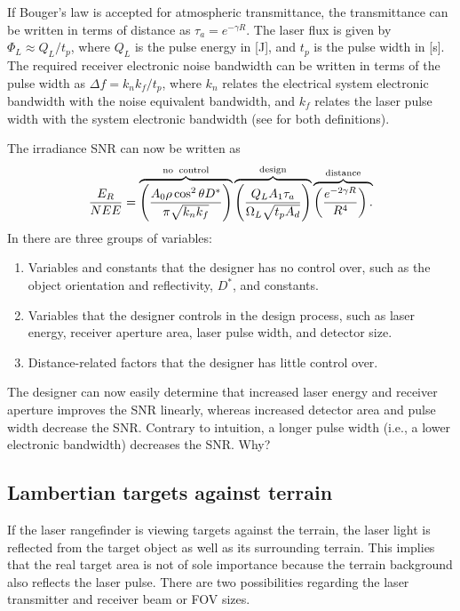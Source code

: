 If Bouger's law is accepted for atmospheric transmittance, the transmittance can be written in terms of distance as $\tau_a=e^{-\gamma R}$. The laser flux is given by $\Phi_L\approx Q_L/t_p$, where $Q_L$ is the pulse
energy in [J], and $t_p$ is the pulse width in [s]. The required receiver
electronic noise bandwidth can be written in terms of the pulse width as
$\Delta f=k_nk_f/t_p$, where 
$k_n$ relates the electrical system electronic bandwidth with the noise equivalent bandwidth, and 
$k_f$ relates the laser pulse width with the system electronic bandwidth (see \cite{Willers2013} for both definitions).

The irradiance SNR can now be written as
\begin{equation}
\frac{E_R}{NEE}=
\overbrace{
\left(\frac{A_0\rho \cos^2\theta D^\ast }{\pi \sqrt{k_nk_f}}\right)
}^{\rm no\;\;control}
\overbrace{
\left(\frac{Q_L A_1 \tau_a }{\Omega_L\sqrt{t_p A_d}}\right)
}^{\rm design}
\overbrace{
\left(\frac{e^{-2\gamma R} }{R^4}\right).\\
}^{\rm distance}
\label{lrfd2}
\end{equation}
In  there are three groups of variables:

\begin{enumerate}[1.]

\item 
Variables and constants that the designer has no control over, such as the object orientation and reflectivity, $D^\ast$, and constants.

\item 
Variables that the designer controls in the design process, such as laser energy, receiver aperture area, laser pulse width, and detector size.

\item 
Distance-related factors that the designer has little control over.

\end{enumerate}

The designer can now easily determine that increased laser energy and receiver aperture improves the SNR linearly, whereas increased detector area and pulse width decrease the SNR. Contrary to intuition, a longer pulse width (i.e., a lower electronic bandwidth) decreases the SNR. Why?


\subsection{Lambertian targets against terrain}
\noindent
If the laser rangefinder is viewing targets against the terrain, the laser light is reflected from the target object as well as its  surrounding terrain. This implies that the real target area is not of sole importance because the terrain background also reflects the laser pulse. There are two possibilities regarding the laser transmitter and receiver beam or FOV sizes.

